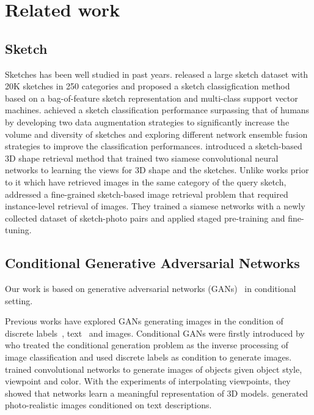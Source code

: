 
\section{Related work}
\subsection{Sketch}
Sketches has been well studied in past years. \cite{HowToSketch} released a large sketch dataset with 20K sketches in 250 categories and proposed a sketch classigfication method based on a bag-of-feature sketch representation and multi-class support vector machines. 
%
\cite{SketchANet} achieved a sketch classification performance surpassing that of humans by developing two data augmentation strategies to significantly increase the volume and diversity of sketches and exploring different network ensemble fusion strategies to improve the classification performances.
\cite{Sketch3DShape} introduced a sketch-based 3D shape retrieval method that trained two siamese convolutional neural networks to learning the views for 3D shape and the sketches.
Unlike works prior to it which have retrieved images in the same category of the query sketch, \cite{SketchMeThatShoe} addressed a fine-grained sketch-based image retrieval problem that required instance-level retrieval of images. They trained a siamese networks with a newly collected dataset of sketch-photo pairs and applied staged pre-training and fine-tuning.

\subsection{Conditional Generative Adversarial Networks}
Our work is based on generative adversarial networks (GANs)~\cite{GAN} in conditional setting. 

Previous works have explored GANs generating images in the condition of discrete labels~\cite{CGAN}, text~\cite{Reed2016} and images. 
Conditional GANs were firstly introduced by \cite{CGAN} who treated the conditional generation problem as the inverse processing of image classification and used discrete labels as condition to generate images.
%
\cite{Dosovitskiy2014} trained convolutional networks to generate images of objects given object style, viewpoint and color. With the experiments of interpolating viewpoints, they showed that networks learn a meaningful representation of 3D models. 
%
\cite{Reed2016} generated photo-realistic images conditioned on text descriptions.

